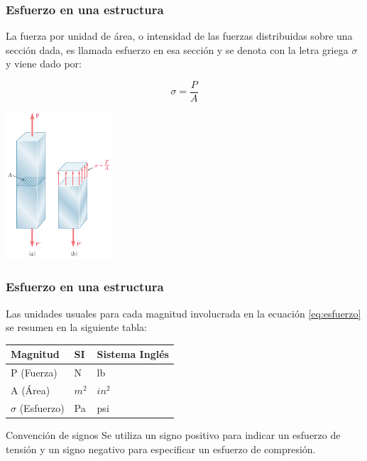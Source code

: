 \documentclass{beamer}
\begin{document}
\begin{frame}
\frametitle{Esfuerzo en una estructura}
\justifying

La fuerza por unidad de área, o intensidad de las fuerzas distribuidas sobre una sección dada, es 
llamada esfuerzo en esa sección y se denota con la letra griega $\sigma$ y viene dado por:

\begin{equation}\label{eq:esfuerzo}
\sigma = \frac{P}{A}
\end{equation}

\begin{center}
\includegraphics[width=0.3\textwidth]{img/axial_load.PNG}
\end{center}

\end{frame}


\begin{frame}
\frametitle{Esfuerzo en una estructura}
\justifying

Las unidades usuales para cada magnitud involucrada en la ecuación \ref{eq:esfuerzo} se resumen en 
la siguiente tabla:

\begin{table}[h!]
\centering
\begin{tabular}{P{3cm} P{3cm} P{3cm}}
\hline
\bfseries Magnitud & \bfseries SI & \bfseries Sistema Inglés \\
\hline
P (Fuerza) & N & lb \\
A (Área) & $m^2$ & $in^2$ \\
$\sigma$ (Esfuerzo) & Pa & psi \\
\hline
\end{tabular}
\end{table}

\begin{informacion}{Convención de signos}
Se utiliza un signo positivo para indicar un esfuerzo de tensión y un signo negativo para especificar un 
esfuerzo de compresión.
\end{informacion}



\end{frame}
\end{document}

